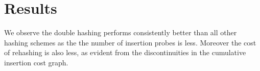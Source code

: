 \documentclass[12pt]{article}
\begin{document}
\section{Results}\label{results}
We observe the double hashing performs consistently better than all other hashing schemes as the the number of insertion probes is less. Moreover the cost of rehashing is also less, as evident from the discontinuities in the cumulative insertion cost graph.
\end{document}
